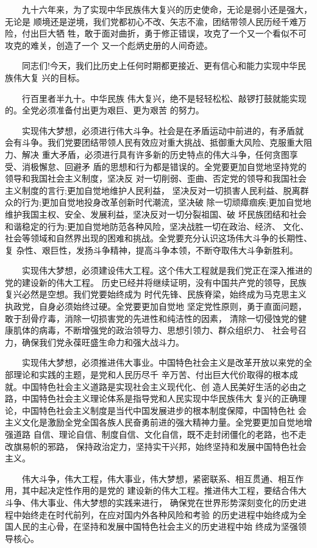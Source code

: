 \documentclass[11pt]{ctexart}
\begin{document}
{{{{　　九十六年来，为了实现中华民族伟大复兴的历史使命，无论是弱小还是强大，无论是
顺境还是逆境，我们党都初心不改、矢志不渝，团结带领人民历经千难万险，付出巨大牺
牲，敢于面对曲折，勇于修正错误，攻克了一个又一个看似不可攻克的难关，创造了一个
又一个彪炳史册的人间奇迹。

　　同志们!今天，我们比历史上任何时期都更接近、更有信心和能力实现中华民族伟大复
兴的目标。


　　行百里者半九十。中华民族
伟大复兴，绝不是轻轻松松、敲锣打鼓就能实现的。全党必须准备付出更为艰巨、更为艰苦
的努力。

　　实现伟大梦想，必须进行伟大斗争。社会是在矛盾运动中前进的，有矛盾就
会有斗争。我们党要团结带领人民有效应对重大挑战、抵御重大风险、克服重大阻力、解决
重大矛盾，必须进行具有许多新的历史特点的伟大斗争，任何贪图享受、消极懈怠、回避矛
盾的思想和行为都是错误的。全党要更加自觉地坚持党的领导和我国社会主义制度，坚决反
对一切削弱、歪曲、否定党的领导和我国社会主义制度的言行;更加自觉地维护人民利益，
坚决反对一切损害人民利益、脱离群众的行为;更加自觉地投身改革创新时代潮流，坚决破
除一切顽瘴痼疾;更加自觉地维护我国主权、安全、发展利益，坚决反对一切分裂祖国、破
坏民族团结和社会和谐稳定的行为;更加自觉地防范各种风险，坚决战胜一切在政治、经济、
文化、社会等领域和自然界出现的困难和挑战。全党要充分认识这场伟大斗争的长期性、复
杂性、艰巨性，发扬斗争精神，提高斗争本领，不断夺取伟大斗争新胜利。

　　实现伟大梦想，必须建设伟大工程。这个伟大工程就是我们党正在深入推进的党的建设新的伟大工程。
历史已经并将继续证明，没有中国共产党的领导，民族复兴必然是空想。我们党要始终成为
时代先锋、民族脊梁，始终成为马克思主义执政党，自身必须始终过硬。全党要更加自觉地
坚定党性原则，勇于直面问题，敢于刮骨疗毒，消除一切损害党的先进性和纯洁性的因素，
清除一切侵蚀党的健康肌体的病毒，不断增强党的政治领导力、思想引领力、群众组织力、
社会号召力，确保我们党永葆旺盛生命力和强大战斗力。

　　实现伟大梦想，必须推进伟大事业。中国特色社会主义是改革开放以来党的全部理论和实践的主题，是党和人民历尽千
辛万苦、付出巨大代价取得的根本成就。中国特色社会主义道路是实现社会主义现代化、创
造人民美好生活的必由之路，中国特色社会主义理论体系是指导党和人民实现中华民族伟大
复兴的正确理论，中国特色社会主义制度是当代中国发展进步的根本制度保障，中国特色社
会主义文化是激励全党全国各族人民奋勇前进的强大精神力量。全党要更加自觉地增强道路
自信、理论自信、制度自信、文化自信，既不走封闭僵化的老路，也不走改旗易帜的邪路，
保持政治定力，坚持实干兴邦，始终坚持和发展中国特色社会主义。

　　伟大斗争，伟大工程，伟大事业，伟大梦想，紧密联系、相互贯通、相互作用，其中起决定性作用的是党的
建设新的伟大工程。推进伟大工程，要结合伟大斗争、伟大事业、伟大梦想的实践来进行，
确保党在世界形势深刻变化的历史进程中始终走在时代前列，在应对国内外各种风险和考验
的历史进程中始终成为全国人民的主心骨，在坚持和发展中国特色社会主义的历史进程中始
终成为坚强领导核心。

}}}}
\end{document}
